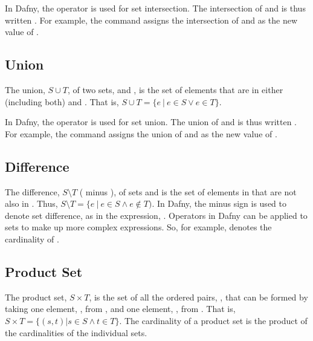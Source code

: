 \documentclass[letterpaper,10pt,english]{sphinxmanual}
\begin{document}
In Dafny, the \sphinxstyleemphasis{*} operator is used for set intersection.  The
intersection of  and  is thus written . For example, the
command  assigns the intersection of  and  as the
new value of .


\subsection{Union}
\label{\detokenize{07-set-theory:union}}
The union, \(S \cup T\), of two sets,  and , is the set of
elements that are in either (including both)  and . That is,
\(S \cup T = \{ e~|~e \in S \lor e \in T \}\).

In Dafny, the \sphinxstyleemphasis{+} operator is used for set union.  The union of 
and  is thus written . For example, the command  assigns the union of  and  as the new value of .


\subsection{Difference}
\label{\detokenize{07-set-theory:difference}}
The difference, \(S \setminus T\) ( minus ), of sets  and
 is the set of elements in  that are not also in . Thus,
\(S \setminus T = \{e~|~e \in S \land e \notin T)\). In Dafny, the
minus sign is used to denote set difference, as in the expression,
. Operators in Dafny can be applied to sets to make up more
complex expressions. So, for example,  denotes the cardinality
of .


\subsection{Product Set}
\label{\detokenize{07-set-theory:product-set}}
The product set, \(S \times T\), is the set of all the ordered
pairs, , that can be formed by taking one element, , from
, and one element, , from . That is, \(S \times T = \{
(s, t) | s \in S \land t \in T \}\). The cardinality of a product set
is the product of the cardinalities of the individual sets.
\end{document}
